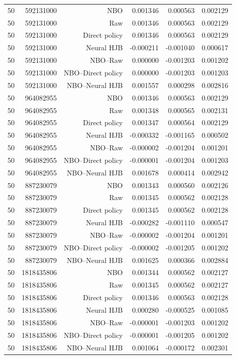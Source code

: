 \begin{longtable}{lrrrrr}
50 & 592131000 & NBO & 0.001346 & 0.000563 & 0.002129 \\
50 & 592131000 & Raw & 0.001346 & 0.000563 & 0.002129 \\
50 & 592131000 & Direct policy & 0.001346 & 0.000563 & 0.002129 \\
50 & 592131000 & Neural HJB & -0.000211 & -0.001040 & 0.000617 \\
50 & 592131000 & NBO--Raw & 0.000000 & -0.001203 & 0.001202 \\
50 & 592131000 & NBO--Direct policy & 0.000000 & -0.001203 & 0.001203 \\
50 & 592131000 & NBO--Neural HJB & 0.001557 & 0.000298 & 0.002816 \\
50 & 964082955 & NBO & 0.001346 & 0.000563 & 0.002129 \\
50 & 964082955 & Raw & 0.001348 & 0.000565 & 0.002131 \\
50 & 964082955 & Direct policy & 0.001347 & 0.000564 & 0.002129 \\
50 & 964082955 & Neural HJB & -0.000332 & -0.001165 & 0.000502 \\
50 & 964082955 & NBO--Raw & -0.000002 & -0.001204 & 0.001201 \\
50 & 964082955 & NBO--Direct policy & -0.000001 & -0.001204 & 0.001203 \\
50 & 964082955 & NBO--Neural HJB & 0.001678 & 0.000414 & 0.002942 \\
50 & 887230079 & NBO & 0.001343 & 0.000560 & 0.002126 \\
50 & 887230079 & Raw & 0.001345 & 0.000562 & 0.002128 \\
50 & 887230079 & Direct policy & 0.001345 & 0.000562 & 0.002128 \\
50 & 887230079 & Neural HJB & -0.000282 & -0.001110 & 0.000547 \\
50 & 887230079 & NBO--Raw & -0.000002 & -0.001204 & 0.001201 \\
50 & 887230079 & NBO--Direct policy & -0.000002 & -0.001205 & 0.001202 \\
50 & 887230079 & NBO--Neural HJB & 0.001625 & 0.000366 & 0.002884 \\
50 & 1818435806 & NBO & 0.001344 & 0.000562 & 0.002127 \\
50 & 1818435806 & Raw & 0.001345 & 0.000562 & 0.002127 \\
50 & 1818435806 & Direct policy & 0.001346 & 0.000563 & 0.002128 \\
50 & 1818435806 & Neural HJB & 0.000280 & -0.000525 & 0.001085 \\
50 & 1818435806 & NBO--Raw & -0.000001 & -0.001203 & 0.001202 \\
50 & 1818435806 & NBO--Direct policy & -0.000001 & -0.001205 & 0.001202 \\
50 & 1818435806 & NBO--Neural HJB & 0.001064 & -0.000172 & 0.002301 \\
\bottomrule
\end{longtable}
